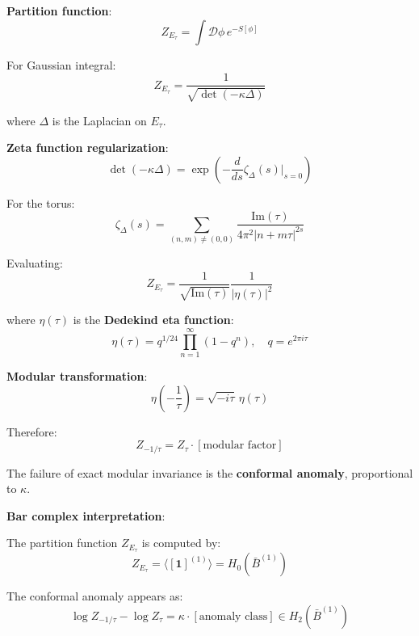 \textbf{Partition function}:
\begin{equation}
Z_{E_\tau} = \int \mathcal{D}\phi \, e^{-S[\phi]}
\end{equation}

For Gaussian integral:
\begin{equation}
Z_{E_\tau} = \frac{1}{\sqrt{\det(-\kappa \Delta)}}
\end{equation}

where $\Delta$ is the Laplacian on $E_\tau$.

\textbf{Zeta function regularization}:
\begin{equation}
\det(-\kappa \Delta) = \exp\left( -\frac{d}{ds} \zeta_{\Delta}(s) \Big|_{s=0} \right)
\end{equation}

For the torus:
\begin{equation}
\zeta_\Delta(s) = \sum_{(n,m) \neq (0,0)} \frac{\text{Im}(\tau)}{4\pi^2 |n + m\tau|^{2s}}
\end{equation}

Evaluating:
\begin{equation}
Z_{E_\tau} = \frac{1}{\sqrt{\text{Im}(\tau)}} \frac{1}{|\eta(\tau)|^2}
\end{equation}

where $\eta(\tau)$ is the \textbf{Dedekind eta function}:
\begin{equation}
\eta(\tau) = q^{1/24} \prod_{n=1}^\infty (1 - q^n), \quad q = e^{2\pi i \tau}
\end{equation}

\textbf{Modular transformation}:
\begin{equation}
\eta\left(-\frac{1}{\tau}\right) = \sqrt{-i\tau} \, \eta(\tau)
\end{equation}

Therefore:
\begin{equation}
Z_{-1/\tau} = Z_\tau \cdot [\text{modular factor}]
\end{equation}

The failure of exact modular invariance is the \textbf{conformal anomaly}, proportional to $\kappa$.

\textbf{Bar complex interpretation}:

The partition function $Z_{E_\tau}$ is computed by:
\begin{equation}
Z_{E_\tau} = \langle [\mathbf{1}]^{(1)} \rangle = H_0(\bar{B}^{(1)})
\end{equation}

The conformal anomaly appears as:
\begin{equation}
\log Z_{-1/\tau} - \log Z_\tau = \kappa \cdot [\text{anomaly class}] \in H_2(\bar{B}^{(1)})
\end{equation}

